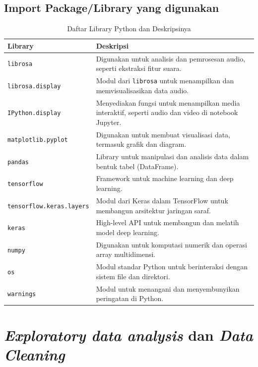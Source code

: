 \subsection{Import Package/Library yang digunakan}
\begin{table}[H]
    \centering
    \caption{Daftar Library Python dan Deskripsinya}
    \begin{tabular}{l p{8cm}}
        \hline
        \textbf{Library} & \textbf{Deskripsi} \\ \hline
        \texttt{librosa} & Digunakan untuk analisis dan pemrosesan audio, seperti ekstraksi fitur suara. \\
        \texttt{librosa.display} & Modul dari \texttt{librosa} untuk menampilkan dan memvisualisasikan data audio. \\
        \texttt{IPython.display} & Menyediakan fungsi untuk menampilkan media interaktif, seperti audio dan video di notebook Jupyter. \\
        \texttt{matplotlib.pyplot} & Digunakan untuk membuat visualisasi data, termasuk grafik dan diagram. \\
        \texttt{pandas} & Library untuk manipulasi dan analisis data dalam bentuk tabel (DataFrame). \\
        \texttt{tensorflow} & Framework untuk machine learning dan deep learning. \\
        \texttt{tensorflow.keras.layers} & Modul dari Keras dalam TensorFlow untuk membangun arsitektur jaringan saraf. \\
        \texttt{keras} & High-level API untuk membangun dan melatih model deep learning. \\
        \texttt{numpy} & Digunakan untuk komputasi numerik dan operasi array multidimensi. \\
        \texttt{os} & Modul standar Python untuk berinteraksi dengan sistem file dan direktori. \\
        \texttt{warnings} & Modul untuk menangani dan menyembunyikan peringatan di Python. \\ \hline
    \end{tabular}
    \label{tab:library_python}
\end{table}

\section{\textit{Exploratory data analysis} dan \textit{Data Cleaning}}

